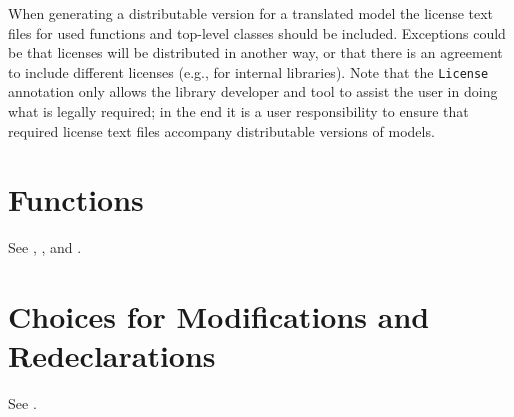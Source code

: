 When generating a distributable version for a translated model the license text files for used functions and top-level classes should be included.
Exceptions could be that licenses will be distributed in another way, or that there is an agreement to include different licenses (e.g., for internal libraries).
Note that the \lstinline!License! annotation only allows the library developer and tool to assist the user in doing what is legally required; in the end it is a user responsibility to ensure that required license text files accompany distributable versions of models.


\section{Functions}\label{annotations-for-functions}

See , , and .


\section{Choices for Modifications and Redeclarations}\label{annotation-choices-for-modifications-and-redeclarations}\label{choices-for-modifications-and-redeclarations}

See .
